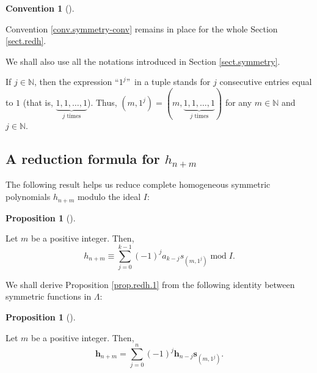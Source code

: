 \documentclass[numbers=enddot,12pt,final,onecolumn,notitlepage]{scrartcl}%
\theoremstyle{definition}
\newtheorem{prop}[theo]{Proposition}
\newenvironment{proposition}[1][]
{\begin{prop}[#1]\begin{leftbar}}
{\end{leftbar}\end{prop}}
\newtheorem{conv}[theo]{Convention}
\newenvironment{convention}[1][]
{\begin{conv}[#1]\begin{leftbar}}
{\end{leftbar}\end{conv}}
\newenvironment{convention}[1][Convention]{\noindent\textbf{#1.} }{\ \rule{0.5em}{0.5em}}
\newenvironment{convention}[1][Convention]{\noindent\textbf{#1.} }{\ \rule{0.5em}{0.5em}}
\let\sumnonlimits\sum
\renewcommand{\sum}{\sumnonlimits\limits}
\begin{document}
\begin{convention}
Convention \ref{conv.symmetry-conv} remains in place for the whole Section
\ref{sect.redh}.

We shall also use all the notations introduced in Section \ref{sect.symmetry}.

If $j\in\mathbb{N}$, then the expression \textquotedblleft$1^{j}%
$\textquotedblright\ in a tuple stands for $j$ consecutive entries equal to
$1$ (that is, $\underbrace{1,1,\ldots,1}_{j\text{ times}}$). Thus, $\left(
m,1^{j}\right)  =\left(  m,\underbrace{1,1,\ldots,1}_{j\text{ times}}\right)
$ for any $m\in\mathbb{N}$ and $j\in\mathbb{N}$.
\end{convention}

\subsection{A reduction formula for $h_{n+m}$}

The following result helps us reduce complete homogeneous symmetric
polynomials $h_{n+m}$ modulo the ideal $I$:

\begin{proposition}
\label{prop.redh.1}Let $m$ be a positive integer. Then,%
\[
h_{n+m}\equiv\sum_{j=0}^{k-1}\left(  -1\right)  ^{j}a_{k-j}s_{\left(
m,1^{j}\right)  }\operatorname{mod}I.
\]

\end{proposition}

We shall derive Proposition \ref{prop.redh.1} from the following identity
between symmetric functions in $\Lambda$:

\begin{proposition}
\label{prop.redh.Lam}Let $m$ be a positive integer. Then,%
\[
\mathbf{h}_{n+m}=\sum_{j=0}^{n}\left(  -1\right)  ^{j}\mathbf{h}%
_{n-j}\mathbf{s}_{\left(  m,1^{j}\right)  }.
\]

\end{proposition}
\end{document}
